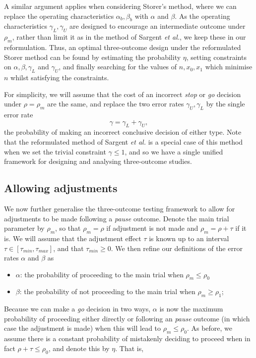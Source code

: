 \documentclass{bmcart}
\begin{document}
A similar argument applies when considering Storer's method, where we can replace the operating characteristics $\alpha_b, \beta_b$ with $\alpha$ and $\beta$. As the operating characteristics $\gamma_L, \gamma_U$ are designed to encourage an intermediate outcome under $\rho_m$, rather than limit it as in the method of Sargent \emph{et al.}, we keep these in our reformulation. Thus, an optimal three-outcome design under the reformulated Storer method can be found by estimating the probability $\eta$, setting constraints on $\alpha, \beta, \gamma_L$ and $\gamma_U$, and finally searching for the values of  $n, x_0, x_1$ which minimise $n$ whilst satisfying the constraints. 

For simplicity, we will assume that the cost of an incorrect \emph{stop} or \emph{go} decision under $\rho = \rho_m$ are the same, and replace the two error rates $\gamma_U, \gamma_L$ by the single error rate
$$
\gamma = \gamma_L + \gamma_U,
$$
the probability of making an incorrect conclusive decision of either type. Note that the reformulated method of Sargent \emph{et al.} is a special case of this method when we set the trivial constraint $\gamma \leq 1$, and so we have a single unified framework for designing and analysing three-outcome studies.

\subsection{Allowing adjustments}\label{sec:adjustments}

We now further generalise the three-outcome testing framework to allow for adjustments to be made following a \emph{pause} outcome. Denote the main trial parameter by $\rho_m$, so that $\rho_m = \rho$ if adjustment is not made and $\rho_m  = \rho + \tau$ if it is. We will assume that the adjustment effect $\tau$ is known up to an interval $\tau \in [\tau_{min}, \tau_{max}]$, and that $\tau_{min} \geq 0$. We then refine our definitions of the error rates $\alpha$ and $\beta$ as

\begin{itemize}
\item $\alpha$: the probability of proceeding to the main trial when $\rho_m \leq \rho_0$
\item $\beta$: the probability of not proceeding to the main trial when $\rho_m \geq \rho_1$;
\end{itemize}

Because we can make a \emph{go} decision in two ways, $\alpha$ is now the maximum probability of proceeding either directly or following an \emph{pause} outcome (in which case the adjustment is made) when this will lead to $\rho_m \leq \rho_0$. As before, we assume there is a constant probability of mistakenly deciding to proceed when in fact $\rho + \tau \leq \rho_0$, and denote this by $\eta$. That is,
\end{document}
